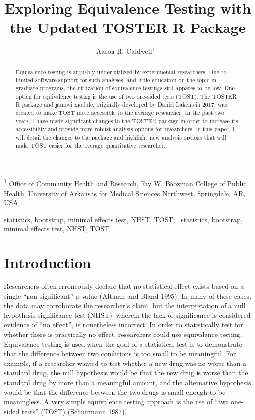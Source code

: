 \documentclass[
]{interact}
\title{Exploring Equivalence Testing with the Updated TOSTER R Package}
\author{Aaron R.
Caldwell$\textsuperscript{1}$~\orcidlink{0000-0002-4541-6283}}
\begin{document}
\captionsetup{labelsep=space}
\maketitle
\textsuperscript{1} Office of Community Health and Research, Fay W.
Boozman College of Public Health, University of Arkansas for Medical
Sciences Northwest, Springdale, AR, USA
\begin{abstract}
Equivalence testing is arguably under utilized by experimental
researchers. Due to limited software support for such analyses, and
little education on the topic in graduate programs, the utilization of
equivalence testings still appares to be low. One option for equivalence
testing is the use of two one-sided tests (TOST). The TOSTER R package
and jamovi module, originally developed by Daniel Lakens in 2017, was
created to make TOST more accessible to the average researcher. In the
past two years, I have made significant changes to the TOSTER package in
order to increase its accessibility and provide more robust analysis
options for researchers. In this paper, I will detail the changes to the
package and highlight new analysis options that will make TOST easier
for the average quantitative researcher.
\end{abstract}
\begin{keywords}
\def\sep{;\ }
statistics, bootstrap, minimal effects test, NHST, TOST\sep 
statistics, bootstrap, minimal effects test, NHST, TOST
\end{keywords}
\ifdefined\Shaded\renewenvironment{Shaded}{\begin{tcolorbox}[boxrule=0pt, interior hidden, borderline west={3pt}{0pt}{shadecolor}, frame hidden, enhanced, sharp corners, breakable]}{\end{tcolorbox}}\fi

\hypertarget{introduction}{%
\section{Introduction}\label{introduction}}

Researchers often erroneously declare that no statistical effect exists
based on a single ``non-significant'' p-value (Altman and Bland 1995).
In many of these cases, the data may corroborate the researcher's claim,
but the interpretation of a null hypothesis significance test (NHST),
wherein the lack of significance is considered evidence of ``no
effect'', is nonetheless incorrect. In order to statistically test for
whether there is practically no effect, researchers could use
equivalence testing. Equivalence testing is used when the goal of a
statistical test is to demonstrate that the difference between two
conditions is too small to be meaningful. For example, if a researcher
wanted to test whether a new drug was no worse than a standard drug, the
null hypothesis would be that the new drug is worse than the standard
drug by more than a meaningful amount, and the alternative hypothesis
would be that the difference between the two drugs is small enough to be
meaningless. A very simple equivalence testing approach is the use of
``two one-sided tests'' (TOST) (Schuirmann 1987).
\end{document}
